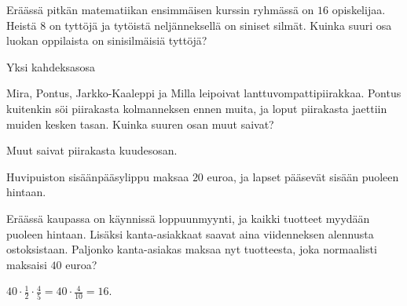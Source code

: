 \begin{tehtavasivu}
\begin{tehtava} 
Eräässä pitkän matematiikan ensimmäisen kurssin ryhmässä on $16$ opiskelijaa. Heistä $8$ on tyttöjä ja tytöistä neljänneksellä on siniset silmät. Kuinka suuri osa luokan oppilaista on sinisilmäisiä tyttöjä?
        \begin{vastaus}
			Yksi kahdeksasosa
        \end{vastaus}
\end{tehtava}


\begin{tehtava}
        Mira, Pontus, Jarkko-Kaaleppi ja Milla leipoivat lanttuvompattipiirakkaa. Pontus kuitenkin söi piirakasta kolmanneksen ennen muita, ja loput piirakasta jaettiin muiden kesken tasan. Kuinka suuren osan muut saivat?
        \begin{vastaus}
            Muut saivat piirakasta kuudesosan.
        \end{vastaus}
\end{tehtava}
    
\begin{tehtava}
    Huvipuiston sisäänpääsylippu maksaa $20$ euroa, ja lapset pääsevät sisään puoleen hintaan.
    \begin{vastaus}
    \end{vastaus}
\end{tehtava}  

\begin{tehtava}
	Eräässä kaupassa on käynnissä loppuunmyynti, ja kaikki tuotteet myydään puoleen hintaan. Lisäksi kanta-asiakkaat saavat aina viidenneksen alennusta ostoksistaan. Paljonko kanta-asiakas maksaa nyt tuotteesta, joka normaalisti maksaisi $40$ euroa?
    \begin{vastaus}
		$40\cdot \frac{1}{2} \cdot \frac{4}{5}=40\cdot \frac{4}{10}= 16$. 
	\end{vastaus}
\end{tehtava}
    

\end{tehtavasivu}
